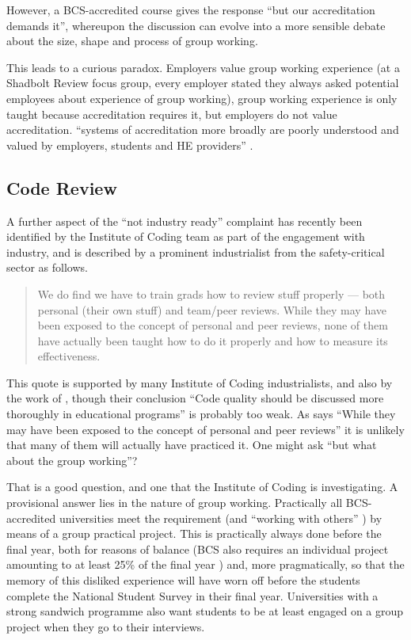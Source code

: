 \documentclass[sigconf,anonymous]{acmart}
\begin{document}
However, a BCS-accredited course gives the response ``but our accreditation demands it'', whereupon the discussion can evolve into a more sensible debate about the size, shape and process of group working.
\par
This leads to a curious paradox. Employers value group working experience (at a Shadbolt Review focus group, every employer stated they always asked potential employees about experience of group working), group working experience is only taught because accreditation requires it, but employers do not value accreditation.  ``systems of accreditation more broadly are poorly understood and valued by employers, students and HE providers'' \cite[\P2.12]{Shadbolt2016a}.

\subsection{Code Review}\label{sec:Code}
A further aspect of the ``not industry ready'' complaint has recently been identified by the Institute of Coding team as part of the engagement with industry, and is described by a prominent industrialist from the safety-critical sector as follows. 
\begin{quote}
We do find we have to train grads how to review stuff properly --- both personal (their own stuff) and team/peer reviews. While they may have been exposed to the concept of personal and peer reviews, none of them have actually been taught how to do it properly and how to measure its effectiveness. \cite{Chapman2018c}
\end{quote}
This quote is supported by many Institute of Coding industrialists, and also by the work of  \cite{Boerstleretal2018a}, though their conclusion ``Code quality should be discussed more thoroughly in educational programs'' is probably too weak. As \cite{Chapman2018c} says ``While they may have been exposed to the concept of personal and peer reviews'' it is unlikely that many of them will actually have practiced it.  One might ask ``but what about the group working''? 
\par
That is a good question, and one that the Institute of Coding is investigating. A provisional answer lies in the nature of group working. Practically all BCS-accredited universities meet the requirement \cite[Requirement 2.3.1]{BCS2018a} (and ``working with others'' \cite[Requirement 2.3.2]{BCS2018a}) by means of a group practical project. This is practically always done before the final year, both for reasons of balance (BCS also requires an individual project amounting to at least 25\% of the final year \cite[Requirement 2.5.1]{BCS2018a}) and, more pragmatically, so that the memory of this disliked experience will have worn off before the students complete the National Student Survey in their final year. Universities with a strong sandwich programme also want students to be at least engaged on a group project when they go to their interviews.
\end{document}

